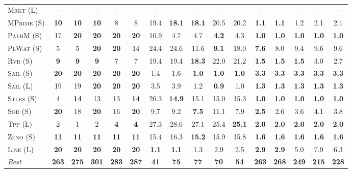 \documentclass[11pt,landscape]{article}
\begin{document}
\begin{table*}[tb]
{\begin{tabular}{|l||ccccc||ccccc||ccccc||}
\textsc{Mrkt} (L)&-&-&-&-&-&-&-&-&-&-&-&-&-&-&-\\
\textsc{MPrime} (S)&\textbf{10}&\textbf{10}&\textbf{10}&8&8&19.4&\textbf{18.1}&\textbf{18.1}&20.5&20.2&\textbf{1.1}&\textbf{1.1}&1.2&2.1&2.1\\
\textsc{PathM} (S)&17&\textbf{20}&\textbf{20}&\textbf{20}&\textbf{20}&10.9&4.7&4.7&\textbf{4.2}&4.3&\textbf{1.0}&\textbf{1.0}&\textbf{1.0}&\textbf{1.0}&\textbf{1.0}\\
\textsc{PlWat} (S)&5&5&\textbf{20}&\textbf{20}&14&24.4&24.6&11.6&\textbf{9.1}&18.0&\textbf{7.6}&8.0&9.4&9.6&9.6\\
\textsc{Rvr} (S)&\textbf{9}&\textbf{9}&\textbf{9}&7&7&19.4&19.4&\textbf{18.3}&22.0&21.2&\textbf{1.5}&\textbf{1.5}&\textbf{1.5}&3.0&2.7\\
\textsc{Sail} (S)&\textbf{20}&\textbf{20}&\textbf{20}&\textbf{20}&\textbf{20}&1.4&1.6&\textbf{1.0}&\textbf{1.0}&\textbf{1.0}&\textbf{3.3}&\textbf{3.3}&\textbf{3.3}&\textbf{3.3}&\textbf{3.3}\\
\textsc{Sail} (L)&19&19&\textbf{20}&\textbf{20}&\textbf{20}&3.5&3.9&1.2&\textbf{0.9}&1.0&\textbf{1.3}&\textbf{1.3}&\textbf{1.3}&\textbf{1.3}&\textbf{1.3}\\
\textsc{Stlrs} (S)&4&\textbf{14}&13&13&\textbf{14}&26.3&\textbf{14.9}&15.1&15.0&15.3&\textbf{1.0}&\textbf{1.0}&\textbf{1.0}&\textbf{1.0}&\textbf{1.0}\\
\textsc{Sgr} (S)&\textbf{20}&18&\textbf{20}&16&\textbf{20}&9.7&9.2&\textbf{7.5}&11.1&7.9&\textbf{2.5}&2.6&3.6&4.1&3.8\\
\textsc{Tpp} (L)&2&1&2&\textbf{4}&\textbf{4}&27.3&28.6&27.1&25.4&\textbf{25.1}&\textbf{2.0}&\textbf{2.0}&\textbf{2.0}&\textbf{2.0}&\textbf{2.0}\\
\textsc{Zeno} (S)&\textbf{11}&\textbf{11}&\textbf{11}&\textbf{11}&\textbf{11}&15.4&16.3&\textbf{15.2}&15.9&15.8&\textbf{1.6}&\textbf{1.6}&\textbf{1.6}&\textbf{1.6}&\textbf{1.6}\\
\textsc{Line} (L)&\textbf{20}&\textbf{20}&\textbf{20}&\textbf{20}&\textbf{20}&\textbf{1.1}&\textbf{1.1}&1.3&2.9&2.5&\textbf{2.9}&\textbf{2.9}&5.0&7.9&6.3
\\\hline
\textit{Best}&\textbf{263}&\textbf{275}&\textbf{301}&\textbf{283}&\textbf{287}&\textbf{41}&\textbf{75}&\textbf{77}&\textbf{70}&\textbf{54}&\textbf{263}&\textbf{268}&\textbf{249}&\textbf{215}&\textbf{228}\\\hline

        \end{tabular}}
        \caption{}
        \label{tab:all-patty}
        \end{table*}
        
\end{document}
